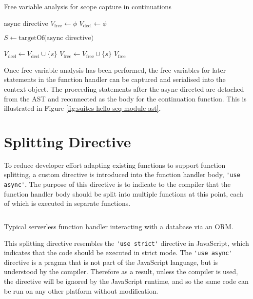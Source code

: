 \begin{algorithm}
\caption{Free variable analysis for scope capture in continuations}
\label{alg:free-variable-analysis}
\begin{algorithmic}[1]
\Require async directive
\State $V_\mathrm{free} \gets \phi$
\State $V_\mathrm{decl} \gets \phi$

\State $S \gets \textrm{targetOf(async directive)}$

        \State $V_\mathrm{decl} \gets V_\mathrm{decl} \cup \{s\}$
            \State $V_\mathrm{free} \gets V_\mathrm{free} \cup \{s\}$
        \EndIf
    \EndIf
\EndFor
\Ensure $V_\mathrm{free}$
\end{algorithmic}
\end{algorithm}

Once free variable analysis has been performed, the free variables for later statements in the function handler can be captured and serialised into the context object. The proceeding statements after the async directed are detached from the AST and reconnected as the body for the continuation function. This is illustrated in Figure \ref{fig:suites-hello-seq-module-ast}.

\section{Splitting Directive}

To reduce developer effort adapting existing functions to support function splitting, a custom directive is introduced into the function handler body, \verb|'use async'|. The purpose of this directive is to indicate to the \faaasc{} compiler that the function handler body should be split into multiple functions at this point, each of which is executed in separate \awslambda{} functions.

\begin{listing}[H]
  \inputminted{javascript}{node_modules/@faaas-bench/hello-seq/src/onHttpGetHello.trigger.ts}
  \caption{Typical serverless function handler interacting with a database via an ORM.}
\end{listing}

This splitting directive resembles the \verb|'use strict'| directive in JavaScript, which indicates that the code should be executed in strict mode. The \verb|'use async'| directive is a pragma that is not part of the JavaScript language, but is understood by the \faaasc{} compiler. Therefore as a result, unless the \faaasc{} compiler is used, the directive will be ignored by the JavaScript runtime, and so the same code can be run on any other \faas{} platform without modification.

